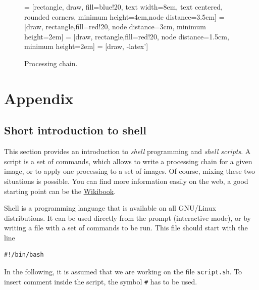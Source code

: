 \documentclass[a4paper,11pt,DIV=18]{scrartcl}
\begin{document}
\begin{figure}
 = [rectangle, draw, fill=blue!20, text width=8em, text centered, rounded corners, minimum height=4em,node distance=3.5cm]
   = [draw, rectangle,fill=red!20, node distance=3cm, minimum height=2em]
   = [draw, rectangle,fill=red!20, node distance=1.5cm, minimum height=2em]
   = [draw, -latex']
\caption{\label{orgspecialblock1}
Processing chain.}
\end{figure}
\section{Appendix}
\label{sec:orgheadline51}
\subsection{Short introduction to shell}
\label{sec:orgheadline25}
This section provides  an introduction to \emph{shell}  programming and \emph{shell
scripts}.   A script  is a  set of  commands, which  allows to  write a
processing chain  for a given image,  or to apply one  processing to a
set  of   images.   Of   course,  mixing   these  two   situations  is
possible. You  can find  more information  easily on  the web,  a good
starting point can be the \href{https://en.wikibooks.org/wiki/Bash_Shell_Scripting}{Wikibook}.

Shell is  a programming  language that is  available on  all GNU/Linux
distributions. It  can be used  directly from the  prompt (interactive
mode), or  by writing a file  with a set  of commands to be  run. This
file should start with the line

\begin{verbatim}
#!/bin/bash
\end{verbatim}
In  the following,  it is  assumed  that we  are working  on the  file
\texttt{script.sh}. To insert comment inside the script, the symbol \texttt{\#} has to be
used.
\end{document}

